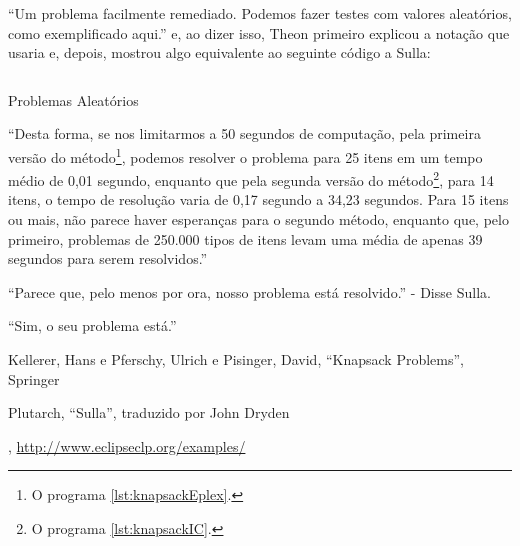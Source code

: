\documentclass{article}
\begin{document}
  ``Um problema facilmente remediado. Podemos fazer testes com valores aleatórios, como exemplificado aqui.'' e, ao dizer isso, Theon
  primeiro explicou a notação que usaria e, depois, mostrou algo equivalente ao seguinte código a Sulla:

  \begin{listing}[H]
    \inputminted{prolog}{../Exemplos/Cap12/test/random.ecl}
    \caption{Problemas Aleatórios}\label{lst:random}
  \end{listing}

  ``Desta forma, se nos limitarmos a 50 segundos de computação, pela primeira versão do
  método\footnote{O programa \ref{lst:knapsackEplex}.}, podemos resolver o problema para 25 itens em
  um tempo médio de 0,01 segundo, enquanto que pela segunda versão do método\footnote{O programa
    \ref{lst:knapsackIC}.}, para 14 itens,  o tempo de resolução varia de 0,17 segundo a 34,23 segundos. Para 15 itens ou mais, não parece haver esperanças para o segundo método, enquanto que, pelo primeiro, problemas de 250.000 tipos de itens levam uma média de apenas 39 segundos para serem resolvidos.''

  ``Parece que, pelo menos por ora, nosso problema está resolvido.'' - Disse Sulla.

  ``Sim, o seu problema está.''



  \begin{thebibliography}{2}

    Kellerer, Hans e Pferschy, Ulrich e Pisinger, David,
    ``Knapsack Problems'', Springer

    Plutarch,
    ``Sulla'', traduzido por John Dryden

    \eclipse,
    \url{http://www.eclipseclp.org/examples/}

  \end{thebibliography}
\end{document}
